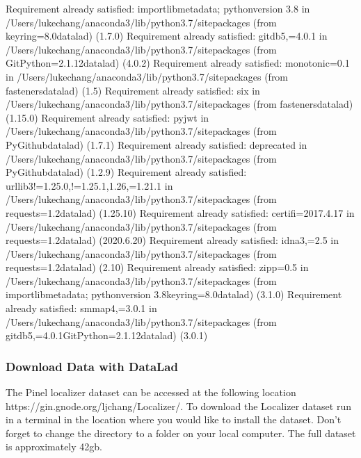 \documentclass[letterpaper,10pt,english]{sphinxmanual}
\begin{document}
\begin{sphinxVerbatim}[commandchars=\\\{\}]
Requirement already satisfied: importlib\PYGZhy{}metadata; python\PYGZus{}version \PYGZlt{} \PYGZdq{}3.8\PYGZdq{} in /Users/lukechang/anaconda3/lib/python3.7/site\PYGZhy{}packages (from keyring\PYGZgt{}=8.0\PYGZhy{}\PYGZgt{}datalad) (1.7.0)
Requirement already satisfied: gitdb\PYGZlt{}5,\PYGZgt{}=4.0.1 in /Users/lukechang/anaconda3/lib/python3.7/site\PYGZhy{}packages (from GitPython\PYGZgt{}=2.1.12\PYGZhy{}\PYGZgt{}datalad) (4.0.2)
Requirement already satisfied: monotonic\PYGZgt{}=0.1 in /Users/lukechang/anaconda3/lib/python3.7/site\PYGZhy{}packages (from fasteners\PYGZhy{}\PYGZgt{}datalad) (1.5)
Requirement already satisfied: six in /Users/lukechang/anaconda3/lib/python3.7/site\PYGZhy{}packages (from fasteners\PYGZhy{}\PYGZgt{}datalad) (1.15.0)
Requirement already satisfied: pyjwt in /Users/lukechang/anaconda3/lib/python3.7/site\PYGZhy{}packages (from PyGithub\PYGZhy{}\PYGZgt{}datalad) (1.7.1)
Requirement already satisfied: deprecated in /Users/lukechang/anaconda3/lib/python3.7/site\PYGZhy{}packages (from PyGithub\PYGZhy{}\PYGZgt{}datalad) (1.2.9)
Requirement already satisfied: urllib3!=1.25.0,!=1.25.1,\PYGZlt{}1.26,\PYGZgt{}=1.21.1 in /Users/lukechang/anaconda3/lib/python3.7/site\PYGZhy{}packages (from requests\PYGZgt{}=1.2\PYGZhy{}\PYGZgt{}datalad) (1.25.10)
Requirement already satisfied: certifi\PYGZgt{}=2017.4.17 in /Users/lukechang/anaconda3/lib/python3.7/site\PYGZhy{}packages (from requests\PYGZgt{}=1.2\PYGZhy{}\PYGZgt{}datalad) (2020.6.20)
Requirement already satisfied: idna\PYGZlt{}3,\PYGZgt{}=2.5 in /Users/lukechang/anaconda3/lib/python3.7/site\PYGZhy{}packages (from requests\PYGZgt{}=1.2\PYGZhy{}\PYGZgt{}datalad) (2.10)
Requirement already satisfied: zipp\PYGZgt{}=0.5 in /Users/lukechang/anaconda3/lib/python3.7/site\PYGZhy{}packages (from importlib\PYGZhy{}metadata; python\PYGZus{}version \PYGZlt{} \PYGZdq{}3.8\PYGZdq{}\PYGZhy{}\PYGZgt{}keyring\PYGZgt{}=8.0\PYGZhy{}\PYGZgt{}datalad) (3.1.0)
Requirement already satisfied: smmap\PYGZlt{}4,\PYGZgt{}=3.0.1 in /Users/lukechang/anaconda3/lib/python3.7/site\PYGZhy{}packages (from gitdb\PYGZlt{}5,\PYGZgt{}=4.0.1\PYGZhy{}\PYGZgt{}GitPython\PYGZgt{}=2.1.12\PYGZhy{}\PYGZgt{}datalad) (3.0.1)
\end{sphinxVerbatim}


\subsubsection{Download Data with DataLad}
\label{\detokenize{content/Download_Data:download-data-with-datalad}}
The Pinel localizer dataset can be accessed at the following location https://gin.g\sphinxhyphen{}node.org/ljchang/Localizer/. To download the Localizer dataset run  in a terminal in the location where you would like to install the dataset. Don’t forget to change the directory to a folder on your local computer. The full dataset is approximately 42gb.
\end{document}
